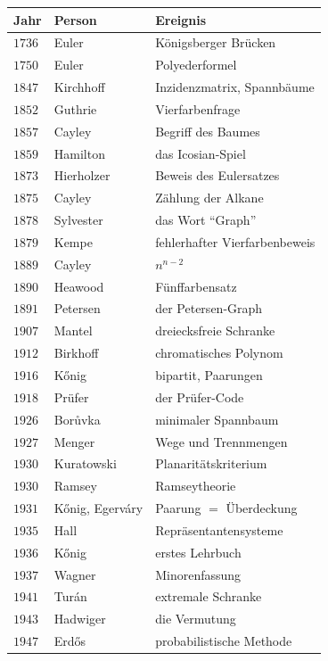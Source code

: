 \begin{merksatz}
\begin{center}
{\small
\renewcommand{\arraystretch}{1.38}
\begin{tabular}{@{}P{1.4cm}P{2.8cm}P{4.0cm}@{}}
\toprule
\textbf{Jahr} & \textbf{Person} & \textbf{Ereignis}\\
\midrule
$1736$ & Euler & Königsberger Brücken\\
$1750$ & Euler & Polyederformel\\
$1847$ & Kirchhoff & Inzidenzmatrix, Spannbäume\\
$1852$ & Guthrie & Vierfarbenfrage\\
$1857$ & Cayley & Begriff des Baumes\\
$1859$ & Hamilton & das Icosian-Spiel\\
$1873$ & Hierholzer & Beweis des Eulersatzes\\
$1875$ & Cayley & Zählung der Alkane\\
$1878$ & Sylvester & das Wort \enquote{Graph}\\
$1879$ & Kempe & fehlerhafter Vierfarbenbeweis\\
$1889$ & Cayley & $n^{n-2}$\\
$1890$ & Heawood & Fünffarbensatz\\
$1891$ & Petersen & der Petersen-Graph\\
$1907$ & Mantel & dreiecksfreie Schranke\\
$1912$ & Birkhoff & chromatisches Polynom\\
$1916$ & Kőnig & bipartit, Paarungen\\
$1918$ & Prüfer & der Prüfer-Code\\
$1926$ & Borůvka & minimaler Spannbaum\\
$1927$ & Menger & Wege und Trennmengen\\
$1930$ & Kuratowski & Planaritätskriterium\\
$1930$ & Ramsey & Ramseytheorie\\
$1931$ & Kőnig, Egerváry & Paarung $=$ Überdeckung\\
$1935$ & Hall & Repräsentantensysteme\\
$1936$ & Kőnig & erstes Lehrbuch\\
$1937$ & Wagner & Minorenfassung\\
$1941$ & Turán & extremale Schranke\\
$1943$ & Hadwiger & die Vermutung\\
$1947$ & Erdős & probabilistische Methode\\

\end{tabular}}
\end{center}
\end{merksatz}
